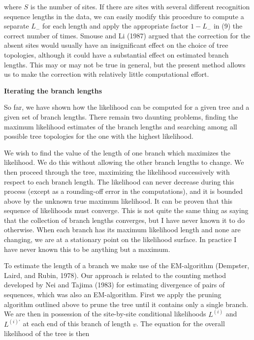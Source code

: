 where $S$
is the number of sites.  If there are sites with several different recognition
sequence lengths in the data, we can easily modify this procedure to compute
a separate $L_-$ for each length and apply the appropriate factor $1-L_-$ in
(9) the correct number of times.  Smouse and Li (1987) argued that the
correction for the absent sites would usually have an insignificant effect on
the choice of tree topologies, although it could have a substantial effect
on estimated branch lengths.  This may or may not be true in general, but the
present method allows us to make the correction with relatively little
computational effort.
\bigskip

\centerline{\bf Iterating the branch lengths}

So far, we have shown how the likelihood can be computed for a given tree
and a given set of branch lengths.  There remain two daunting problems,
finding the maximum likelihood estimates of the branch lengths and searching
among all possible tree topologies for the one with the highest likelihood.

We wish to find the value of the length of one branch which maximizes the
likelihood.  We do this without allowing the other branch lengths to change.
We then proceed through the tree, maximizing the likelihood successively
with respect to each branch length.  The likelihood can never decrease
during this process (except as a rounding-off error in the computations), and
it is bounded above by the unknown true maximum likelihood.  It can be
proven that this sequence of likelihoods must converge.  This is not quite
the same thing as saying that the collection of branch lengths converges,
but I have never known it to do otherwise.  When each branch has its
maximum likelihood length and none are changing, we are at a stationary point
on the likelihood surface.  In practice I have never known this to be
anything but a maximum.

To estimate the length of a branch we make use of the EM-algorithm (Dempster,
Laird, and Rubin, 1978).  Our approach is related to the counting method developed by Nei and Tajima (1983) for estimating divergence of pairs of sequences,
which was also an EM-algorithm.  First we apply the pruning algorithm outlined
above to prune the tree until it contains only a single branch.  We are then
in possession of the site-by-site conditional likelihoods $L^{(i)}$
and $L^{(i)'}$ at each end of this branch of length $v$.  The equation for the
overall likelihood of the tree is then

